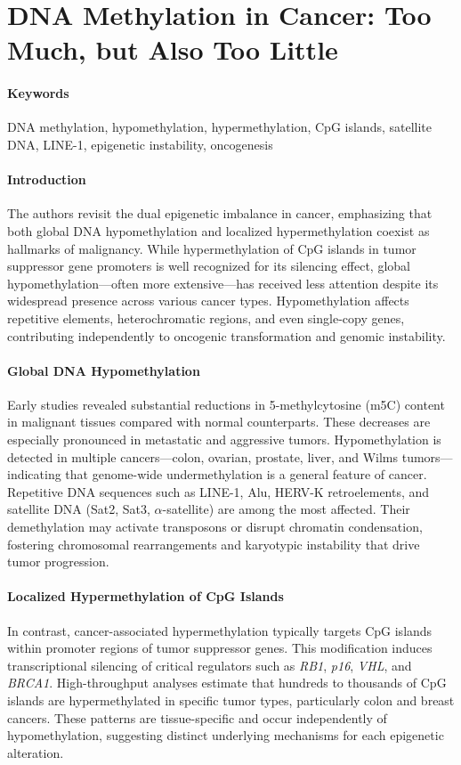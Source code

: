 \documentclass[10pt]{extarticle}
\begin{document}
\section{DNA Methylation in Cancer: Too Much, but Also Too Little}

\paragraph{Keywords} DNA methylation, hypomethylation, hypermethylation, CpG islands, satellite DNA, LINE-1, epigenetic instability, oncogenesis  \cite{ehrlich2002dna}

\paragraph{Introduction}
The authors revisit the dual epigenetic imbalance in cancer, emphasizing that both global DNA hypomethylation and localized hypermethylation coexist as hallmarks of malignancy. While hypermethylation of CpG islands in tumor suppressor gene promoters is well recognized for its silencing effect, global hypomethylation—often more extensive—has received less attention despite its widespread presence across various cancer types. Hypomethylation affects repetitive elements, heterochromatic regions, and even single-copy genes, contributing independently to oncogenic transformation and genomic instability.

\paragraph{Global DNA Hypomethylation}
Early studies revealed substantial reductions in 5-methylcytosine (m5C) content in malignant tissues compared with normal counterparts. These decreases are especially pronounced in metastatic and aggressive tumors. Hypomethylation is detected in multiple cancers—colon, ovarian, prostate, liver, and Wilms tumors—indicating that genome-wide undermethylation is a general feature of cancer. Repetitive DNA sequences such as LINE-1, Alu, HERV-K retroelements, and satellite DNA (Sat2, Sat3, $\alpha$-satellite) are among the most affected. Their demethylation may activate transposons or disrupt chromatin condensation, fostering chromosomal rearrangements and karyotypic instability that drive tumor progression.

\paragraph{Localized Hypermethylation of CpG Islands}
In contrast, cancer-associated hypermethylation typically targets CpG islands within promoter regions of tumor suppressor genes. This modification induces transcriptional silencing of critical regulators such as \textit{RB1}, \textit{p16}, \textit{VHL}, and \textit{BRCA1}. High-throughput analyses estimate that hundreds to thousands of CpG islands are hypermethylated in specific tumor types, particularly colon and breast cancers. These patterns are tissue-specific and occur independently of hypomethylation, suggesting distinct underlying mechanisms for each epigenetic alteration.
\end{document}
